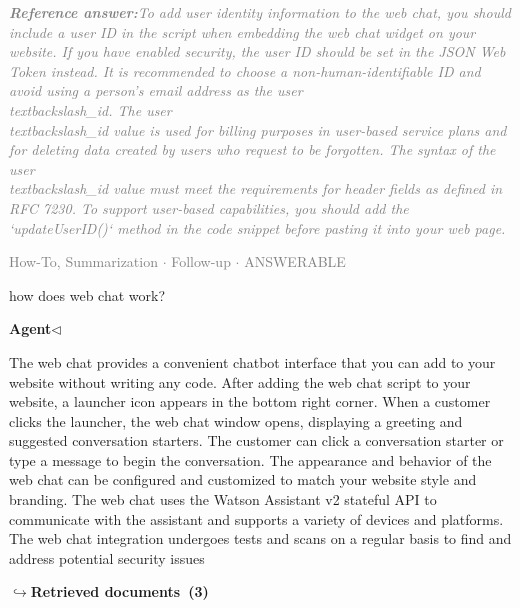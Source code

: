\documentclass[a4paper,11pt]{article}
\begin{document}
\begin{refanswerenv}
{\footnotesize\textit{\textcolor{gray}{\textbf{Reference answer:}\enspace To add user identity information to the web chat, you should include a user ID in the script when embedding the web chat widget on your website. If you have enabled security, the user ID should be set in the JSON Web Token instead. It is recommended to choose a non-human-identifiable ID and avoid using a person's email address as the user\\textbackslash{}\_id. The user\\textbackslash{}\_id value is used for billing purposes in user-based service plans and for deleting data created by users who request to be forgotten. The syntax of the user\\textbackslash{}\_id value must meet the requirements for header fields as defined in RFC 7230. To support user-based capabilities, you should add the `updateUserID()` method in the code snippet before pasting it into your web page.}}}
\end{refanswerenv}
\vspace{0.5em}
\hfill{\tiny\textcolor{gray}{How-To, Summarization $\cdot$ Follow-up $\cdot$ ANSWERABLE}}
\begin{userbubble}
how does web chat work?
\end{userbubble}
\noindent\hfill{\small\textcolor{agentcolor}{\textbf{Agent\enspace$\triangleleft$}}}
\begin{agentbubble}
The web chat provides a convenient chatbot interface that you can add to your website without writing any code. After adding the web chat script to your website, a launcher icon appears in the bottom right corner. When a customer clicks the launcher, the web chat window opens, displaying a greeting and suggested conversation starters. The customer can click a conversation starter or type a message to begin the conversation. The appearance and behavior of the web chat can be configured and customized to match your website style and branding. The web chat uses the Watson Assistant v2 stateful API to communicate with the assistant and supports a variety of devices and platforms. The web chat integration undergoes tests and scans on a regular basis to find and address potential security issues
\end{agentbubble}
\noindent\hfill{\footnotesize\textcolor{doccolor}{\textbf{$\hookrightarrow$\enspace Retrieved documents~(3)}}}
\end{document}
